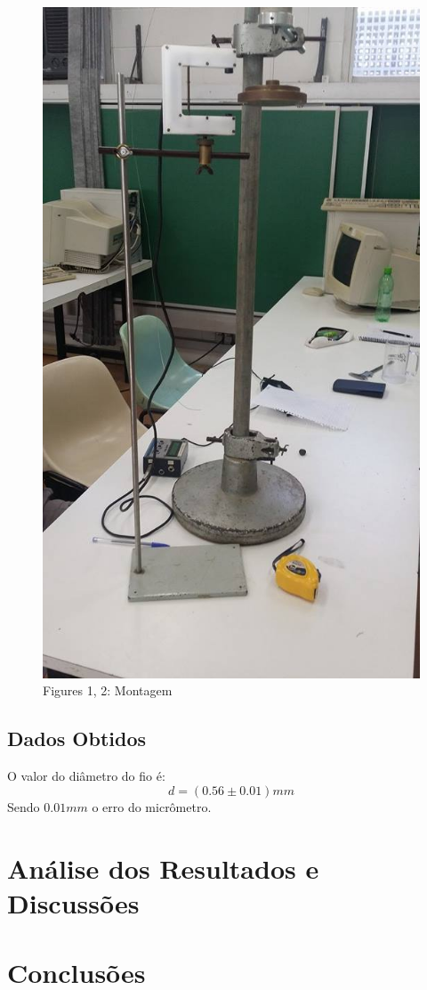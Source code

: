 \documentclass[12pt,a4paper]{article}
\begin{document}
\begin{figure}[!htbp]
	\includegraphics[scale=0.30]{02.jpg}\\
	Figures 1, 2: Montagem
\end{figure}

\subsection{Dados Obtidos}
O valor do diâmetro do fio é:
$$ d = (0.56 \pm 0.01) mm $$
Sendo $0.01 mm$ o erro do micrômetro.\\

\section{Análise dos Resultados e Discussões}


\section{Conclusões}
\end{document}
